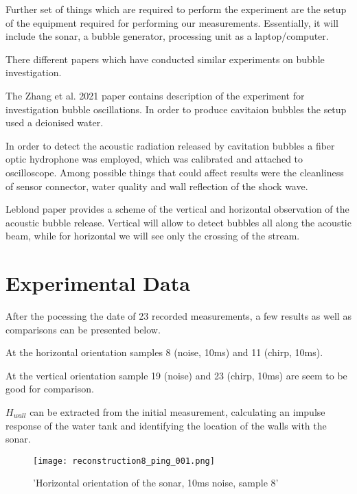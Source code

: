 Further set of things which are required to perform the experiment are the setup of the equipment required for performing our measurements. 
Essentially, it will include the sonar, a bubble generator, processing unit as a laptop/computer.

There different papers which have conducted similar experiments on bubble investigation. 

The Zhang et al. 2021\cite{zhang_experimental_2021} paper contains description of the experiment for investigation bubble oscillations. In order to produce cavitaion bubbles the setup used a deionised water.

In order to detect the acoustic radiation released by cavitation bubbles a fiber optic hydrophone was employed, which was calibrated and attached to oscilloscope.  
Among possible things that could affect results were the cleanliness of sensor connector, water quality and wall reflection of the shock wave.

Leblond paper provides a scheme of the vertical and horizontal observation of the acoustic bubble release\cite{leblond_acoustic_2014}. Vertical will allow to detect bubbles all along the acoustic beam, while for horizontal we will see only the crossing of the stream.

\section{Experimental Data}


After the pocessing the date of 23 recorded measurements, a few results as well as comparisons can be presented below. 

At the horizontal orientation samples 8 (noise, 10ms) and 11 (chirp, 10ms).

At the vertical orientation sample 19 (noise) and 23 (chirp, 10ms) are seem to be good for comparison.

\textbf{$H_{wall}$} can be extracted from the initial measurement, calculating an impulse response of the water tank and identifying the location of the walls with the sonar.

\begin{figure}[H]
    \texttt{[image: reconstruction8\_ping\_001.png]}
    \centering
    \caption*{'Horizontal orientation of the sonar, 10ms noise, sample 8'}
    \label{fig:H_noise_10ms_plot}
\end{figure}


